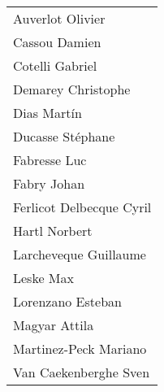 \documentclass[10pt,twoside]{support/latex/sbabook}
\begin{document}
\begin{tabular}{l}
Auverlot Olivier  \\
Cassou Damien\\
Cotelli Gabriel\\
Demarey Christophe\\
Dias Martín\\
Ducasse Stéphane\\
Fabresse Luc\\
Fabry Johan\\
Ferlicot Delbecque Cyril\\
Hartl Norbert\\
Larcheveque Guillaume\\
Leske Max\\
Lorenzano Esteban\\
Magyar Attila\\
Martinez-Peck Mariano\\
Van Caekenberghe Sven\\
\end{tabular}

\backmatter
\end{document}
